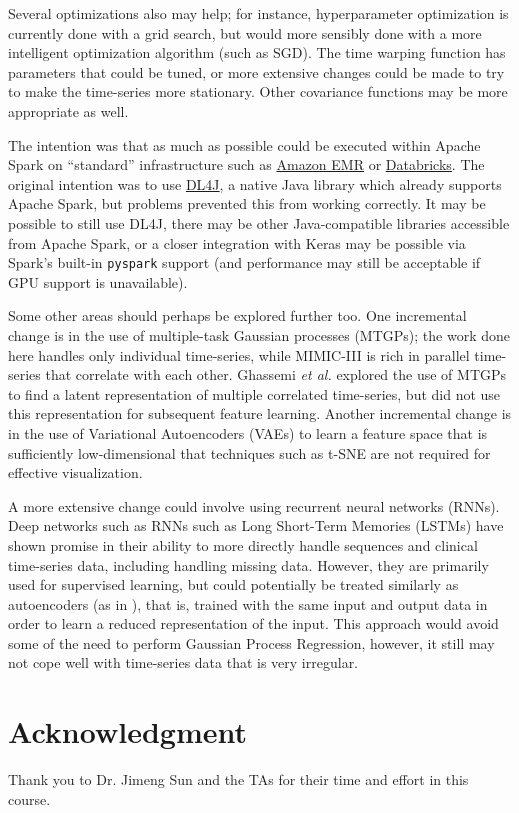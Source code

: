 \documentclass[journal]{IEEEtran}
\begin{document}
Several optimizations also may help; for instance, hyperparameter
optimization is currently done with a grid search, but would more
sensibly done with a more intelligent optimization algorithm (such as
SGD).  The time warping function has parameters that could be tuned,
or more extensive changes\cite{Lasko2015} could be made to try to make
the time-series more stationary.  Other covariance functions may be
more appropriate as well.

The intention was that as much as possible could be executed within
Apache Spark on ``standard'' infrastructure such as
\href{https://aws.amazon.com/emr/}{Amazon EMR} or
\href{https://databricks.com/}{Databricks}.  The original intention
was to use \href{https://deeplearning4j.org/}{DL4J}, a native Java
library which already supports Apache Spark, but problems prevented
this from working correctly.  It may be possible to still use DL4J,
there may be other Java-compatible libraries accessible from Apache
Spark, or a closer integration with Keras may be possible via Spark's
built-in \texttt{pyspark} support (and performance may still be
acceptable if GPU support is unavailable).

Some other areas should perhaps be explored further too.  One
incremental change is in the use of multiple-task Gaussian processes
(MTGPs); the work done here handles only individual time-series, while
MIMIC-III is rich in parallel time-series that correlate with each
other.  Ghassemi \emph{et al.}\cite{Ghassemi2015} explored the use of
MTGPs to find a latent representation of multiple correlated
time-series, but did not use this representation for subsequent
feature learning.  Another incremental change is in the use of
Variational Autoencoders (VAEs) to learn a feature space that is
sufficiently low-dimensional that techniques such as t-SNE are not
required for effective visualization.

A more extensive change could involve using recurrent neural networks
(RNNs).  Deep networks such as RNNs such as Long Short-Term Memories
(LSTMs) have shown promise in their ability to more directly handle
sequences\cite{Sutskever2014} and clinical time-series data, including
handling missing data\cite{Lipton2015, Lipton2015a, Lipton2016}.
However, they are primarily used for supervised learning, but could
potentially be treated similarly as autoencoders (as in
\cite{Klapper-Rybicka2001}), that is, trained with the same input and
output data in order to learn a reduced representation of the input.
This approach would avoid some of the need to perform Gaussian Process
Regression, however, it still may not cope well with time-series data
that is very irregular.

\section*{Acknowledgment}
Thank you to Dr. Jimeng Sun and the TAs for their time and effort in
this course.




\end{document}
